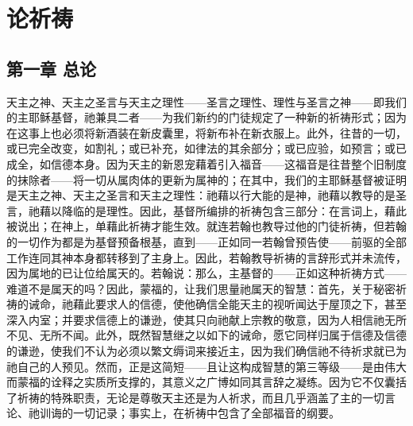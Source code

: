 
\chapter{论祈祷}



\section{第一章 总论}

天主之神、天主之圣言与天主之理性——圣言之理性、理性与圣言之神——即我们的主耶稣基督，祂兼具二者——为我们新约的门徒规定了一种新的祈祷形式；因为在这事上也必须将新酒装在新皮囊里，将新布补在新衣服上。此外，往昔的一切，或已完全改变，如割礼；或已补充，如律法的其余部分；或已应验，如预言；或已成全，如信德本身。因为天主的新恩宠藉着引入福音——这福音是往昔整个旧制度的抹除者——将一切从属肉体的更新为属神的；在其中，我们的主耶稣基督被证明是天主之神、天主之圣言和天主之理性：祂藉以行大能的是神，祂藉以教导的是圣言，祂藉以降临的是理性。因此，基督所编排的祈祷包含三部分：在言词上，藉此被说出；在神上，单藉此祈祷才能生效。就连若翰也教导过他的门徒祈祷，但若翰的一切作为都是为基督预备根基，直到——正如同一若翰曾预告使——前驱的全部工作连同其神本身都转移到了主身上。因此，若翰教导祈祷的言辞形式并未流传，因为属地的已让位给属天的。若翰说：那么，主基督的——正如这种祈祷方式——难道不是属天的吗？因此，蒙福的，让我们思量祂属天的智慧：首先，关于秘密祈祷的诫命，祂藉此要求人的信德，使他确信全能天主的视听闻达于屋顶之下，甚至深入内室；并要求信德上的谦逊，使其只向祂献上宗教的敬意，因为人相信祂无所不见、无所不闻。此外，既然智慧继之以如下的诫命，愿它同样归属于信德及信德的谦逊，使我们不认为必须以繁文缛词来接近主，因为我们确信祂不待祈求就已为祂自己的人预见。然而，正是这简短——且让这构成智慧的第三等级——是由伟大而蒙福的诠释之实质所支撑的，其意义之广博如同其言辞之凝练。因为它不仅囊括了祈祷的特殊职责，无论是尊敬天主还是为人祈求，而且几乎涵盖了主的一切言论、祂训诲的一切记录；事实上，在祈祷中包含了全部福音的纲要。\par


